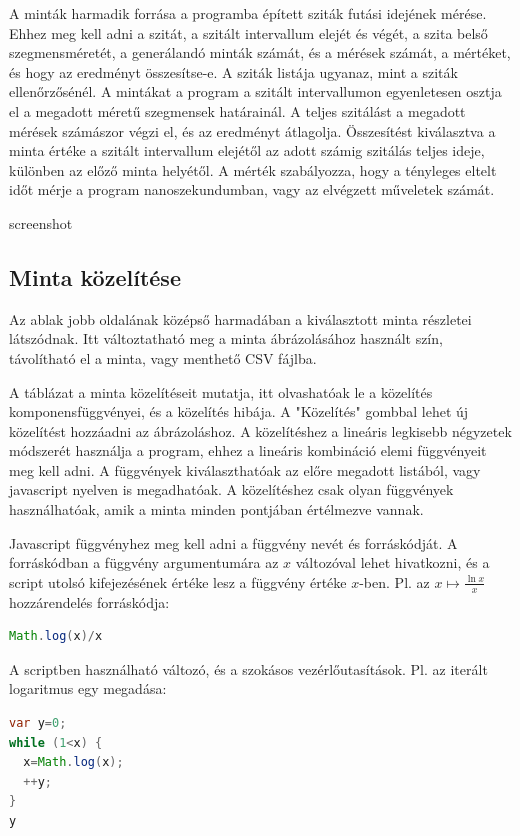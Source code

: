 \documentclass[12pt]{report}
\begin{document}
A minták harmadik forrása a programba épített sziták futási idejének mérése.
Ehhez meg kell adni a szitát, a szitált intervallum elejét és végét,
a szita belső szegmensméretét, a generálandó minták számát, és a mérések számát,
a mértéket, és hogy az eredményt összesítse-e.
A sziták listája ugyanaz, mint a sziták ellenőrzősénél.
A mintákat a program a szitált intervallumon egyenletesen osztja el a megadott méretű
szegmensek határainál. A teljes szitálást a megadott mérések számászor végzi el,
és az eredményt átlagolja.
Összesítést kiválasztva a minta értéke a szitált intervallum elejétől
az adott számig szitálás teljes ideje, különben az előző minta helyétől.
A mérték szabályozza, hogy a tényleges eltelt időt mérje a program nanoszekundumban,
vagy az elvégzett műveletek számát.

{\color{red}screenshot}

\subsection{Minta közelítése}

Az ablak jobb oldalának középső harmadában a kiválasztott minta részletei látszódnak.
Itt változtatható meg a minta ábrázolásához használt szín, távolítható el a minta,
vagy menthető CSV fájlba.

A táblázat a minta közelítéseit mutatja,
itt olvashatóak le a közelítés komponensfüggvényei, és a közelítés hibája.
A "Közelítés" gombbal lehet új közelítést hozzáadni az ábrázoláshoz.
A közelítéshez a lineáris legkisebb négyzetek módszerét használja a program,
ehhez a lineáris kombináció elemi függvényeit meg kell adni.
A függvények kiválaszthatóak az előre megadott listából,
vagy javascript nyelven is megadhatóak.
A közelítéshez csak olyan függvények használhatóak, amik a minta
minden pontjában értélmezve vannak.

Javascript függvényhez meg kell adni a függvény nevét és forráskódját.
A forráskódban a függvény argumentumára az $x$ változóval lehet hivatkozni,
és a script utolsó kifejezésének értéke lesz a függvény
értéke $x$-ben. Pl. az $x \mapsto \frac{\ln{x}}{x}$ hozzárendelés
forráskódja:

{\small
\begin{lstlisting}[language=Java]
Math.log(x)/x
\end{lstlisting}
}

A scriptben használható változó, és a szokásos vezérlőutasítások.
Pl. az iterált logaritmus egy megadása:
{\small
\begin{lstlisting}[language=Java]
var y=0;
while (1<x) {
  x=Math.log(x);
  ++y;
}
y
\end{lstlisting}
}
\end{document}
